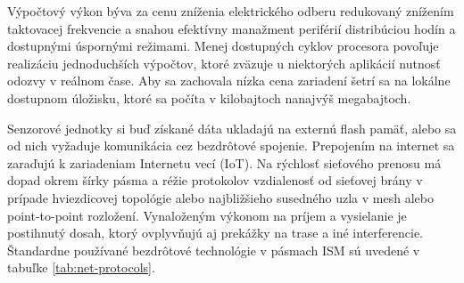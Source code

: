 Výpočtový výkon býva za cenu zníženia elektrického odberu redukovaný
znížením taktovacej frekvencie a snahou efektívny manažment periférií distribúciou hodín a dostupnými
úspornými režimami. Menej dostupných cyklov procesora povoľuje realizáciu jednoduchších výpočtov, ktoré zväzuje
u niektorých aplikácií nutnosť odozvy v reálnom čase. Aby sa zachovala nízka cena zariadení šetrí sa
na lokálne dostupnom úložisku, ktoré sa počíta v kilobajtoch nanajvýš megabajtoch.

Senzorové jednotky si buď získané dáta ukladajú na externú flash pamäť, alebo sa od nich vyžaduje komunikácia
cez bezdrôtové spojenie. Prepojením na internet sa zaraďujú k zariadeniam Internetu vecí (IoT).
Na rýchlosť sieťového prenosu má dopad okrem šírky pásma a réžie protokolov
vzdialenosť od sieťovej brány v prípade hviezdicovej topológie alebo najbližšieho susedného uzla v mesh
alebo point-to-point rozložení. Vynaloženým výkonom na príjem a vysielanie je postihnutý dosah, ktorý
ovplyvňujú aj prekážky na trase a iné interferencie. Štandardne používané bezdrôtové technológie
v pásmach ISM sú uvedené v tabuľke \ref{tab:net-protocols}.

